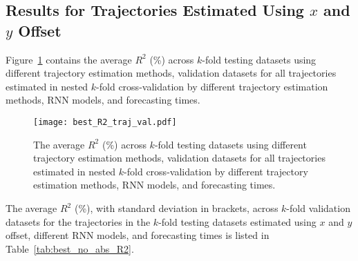 \subsection{Results for Trajectories Estimated Using $x$ and $y$ Offset}

Figure~\ref{fig:best_R2_traj_val} contains the average $R^{2}$ (\%) across $k$-fold testing datasets using different trajectory estimation methods, validation datasets for all trajectories estimated in nested $k$-fold cross-validation by different trajectory estimation methods, RNN models, and forecasting times.

\begin{figure}[!ht]
	\centering
	\texttt{[image: best\_R2\_traj\_val.pdf]}
	\caption{The average $R^{2}$ (\%) across $k$-fold testing datasets using different trajectory estimation methods, validation datasets for all trajectories estimated in nested $k$-fold cross-validation by different trajectory estimation methods, RNN models, and forecasting times.}
	\label{fig:best_R2_traj_val}
\end{figure}

The average $R^{2}$ (\%), with standard deviation in brackets, across $k$-fold validation datasets for the trajectories in the $k$-fold testing datasets estimated using $x$ and $y$ offset, different RNN models, and forecasting times is listed in Table~\ref{tab:best_no_abs_R2}.

\begin{table}[!ht]
	\centering
	\caption{The average $R^{2}$ (\%), with standard deviation in brackets, across $k$-fold validation datasets for the trajectories in the $k$-fold testing datasets estimated using $x$ and $y$ offset, different RNN models, and forecasting times.}
	\label{tab:best_no_abs_R2}
\end{table}

